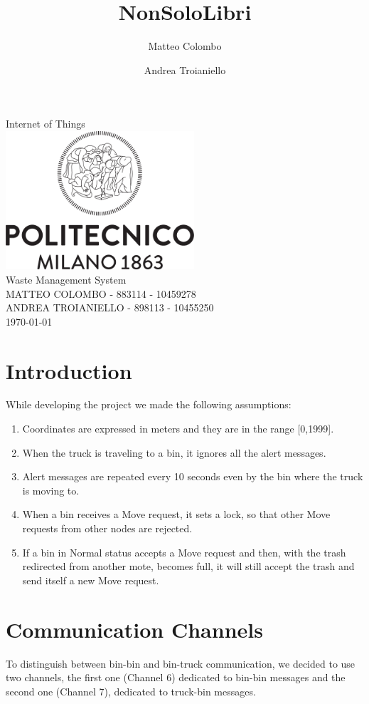 \documentclass[a4paper,12pt,notitlepage]{report}
\author{Matteo Colombo \and Andrea Troianiello}
\title{NonSoloLibri}
\begin{document}
\begin{titlepage}           %
    \centering
    {\Large Internet of Things}\\[4em]
    \includegraphics[width=7cm]{polimi.png}\\[8em]
    {\Huge Waste Management System}\\[4em]
    {\large MATTEO COLOMBO - 883114 - 10459278}\\[1em]
    {\large ANDREA TROIANIELLO - 898113 - 10455250}\\[4em]
    \today
\end{titlepage}


\section*{Introduction}
While developing the project we made the following assumptions:
\begin{enumerate}
    \item Coordinates are expressed in meters and they are in the range [0,1999].
    \item When the truck is traveling to a bin, it ignores all the alert messages.
    \item Alert messages are repeated every 10 seconds even by the bin where the truck is moving to.
    \item When a bin receives a Move request, it sets a lock, so that other Move requests from other nodes are rejected.
    \item If a bin in Normal status accepts a Move request and then, with the trash redirected from another mote,
        becomes full, it will still accept the trash and send itself a new Move request.
\end{enumerate}

\section*{Communication Channels}
To distinguish between bin-bin and bin-truck communication, we decided to use two channels, the first one (Channel 6) dedicated
to bin-bin messages and the second one (Channel 7), dedicated to truck-bin messages.
\end{document}
